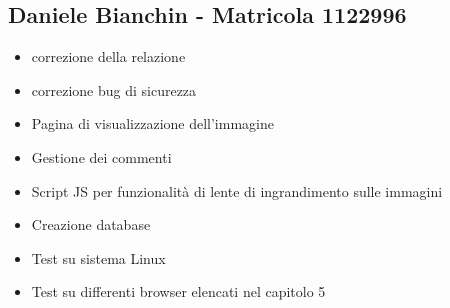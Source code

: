 \documentclass[openany, a4paper, 12pt]{report}
\begin{document}
	\subsection{Daniele Bianchin - Matricola 1122996}
	\begin{itemize}
		\item correzione della relazione
		\item correzione bug di sicurezza
		\item Pagina di visualizzazione dell'immagine
		\item Gestione dei commenti
		\item Script JS per funzionalità di lente di ingrandimento sulle immagini
		\item Creazione database
		\item Test su sistema Linux
		\item Test su differenti browser elencati nel capitolo 5
	\end{itemize}
\end{document}
